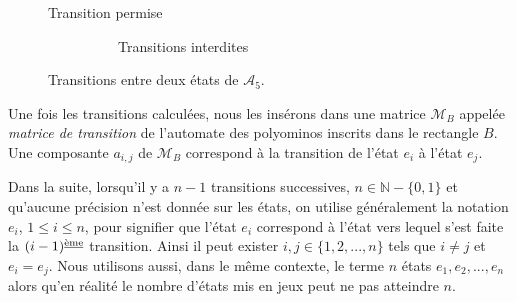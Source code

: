 \begin{Ex}
\begin{figure}[!htb]
\begin{minipage}[c]{.30\linewidth}
  \centering
\begin{logicpuzzle}[rows=2,columns=5,color=cyan!100, width=750px,scale=0.5]
\framepuzzle[black!50]
\end{logicpuzzle}
Transition permise\mbox{ }\mbox{ }\mbox{ }\mbox{ }\mbox{ }
\end{minipage} \hfill
\begin{minipage}[c]{.56\linewidth}
\begin{minipage}[c]{.20\linewidth}
  \centering
\begin{logicpuzzle}[rows=2,columns=5,color=cyan!100, width=750px,scale=0.5]
\framepuzzle[black!50]
\end{logicpuzzle}
\end{minipage} \hfill
\begin{minipage}[c]{.55\linewidth}
\begin{logicpuzzle}[rows=2,columns=5,color=cyan!100, width=750px,scale=0.5]
\framepuzzle[black!50]
\end{logicpuzzle}
\end{minipage} 
  \mbox{ }\mbox{ }\mbox{ }\mbox{ }\mbox{ }\mbox{ }\mbox{ }\mbox{ }\mbox{ }\mbox{ }Transitions interdites
\end{minipage} 
\caption{\label{Atfig8} Transitions entre deux états de $\mathcal{A}_{5}$.}
\end{figure} 
\end{Ex}

Une fois les transitions calculées, nous les insérons dans une matrice $\mathcal{M}_{B}$ appelée \emph{matrice de transition} de l'automate des polyominos inscrits dans le rectangle $B$. Une composante $a_{i,j}$ de $\mathcal{M}_{B}$  correspond à la transition de l'état  $e_{i}$ à l'état $e_{j}$.

Dans la suite, lorsqu'il y a $n-1$ transitions successives, $n\in\mathbb{N}-\{0,1\}$ et qu'aucune précision n'est donnée sur les états, on utilise généralement la notation $e_{i}$, $1\leq i\leq n$, pour  signifier que l'état $e_{i}$ correspond à l'état vers lequel s'est faite la $(i-1)^{\text{\underline{ème}}}$ transition. Ainsi il peut exister $i,j\in \{1,2,...,n\}$ tels que $i\neq j$ et $e_{i}=e_{j}$. Nous utilisons  aussi, dans le même contexte, le terme $n$ états $e_{1},e_{2},...,e_{n}$ alors qu'en réalité le nombre d'états mis en jeux peut ne pas atteindre $n$.

